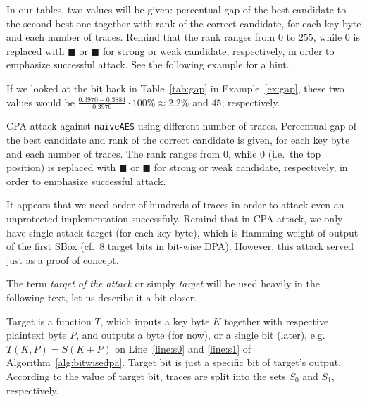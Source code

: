	\begin{note}
	\label{note:tabvals}
		In our tables, two values will be given: percentual gap of the best candidate to the second best one together with rank of the correct candidate, for each key byte and each number of traces. Remind that the rank ranges from $0$ to $255$, while $0$ is replaced with $\blacksquare$ or {\weak$\blacksquare$} for strong or weak candidate, respectively, in order to emphasize successful attack. See the following example for a hint.
	\end{note}
	
	\begin{example}
	\label{ex:gaprank}
		If we looked at the  bit back in Table~\ref{tab:gap} in Example~\ref{ex:gap}, these two values would be $\frac{0.3970-0.3884}{0.3970}\cdot100\%\approx2.2\%$ and $45$, respectively.
	\end{example}
	
	\begin{table}[h]
		\begin{center}
		
		\end{center}
	\caption{CPA attack against {\tt naiveAES} using different number of traces. Percentual gap of the best candidate and rank of the correct candidate is given, for each key byte and each number of traces. The rank ranges from $0$, while $0$ (i.e.\ the top position) is replaced with $\blacksquare$ or {\weak$\blacksquare$} for strong or weak candidate, respectively, in order to emphasize successful attack.}
	\label{tab:naiveaescpa}
	\end{table}
	
	It appears that we need order of hundreds of traces in order to attack even an unprotected implementation successfuly. Remind that in CPA attack, we only have single attack target (for each key byte), which is Hamming weight of output of the first SBox (cf.\ $8$ target bits in bit-wise DPA). However, this attack served just as a proof of concept.
	
	\begin{note}
	\label{note:target}
		The term {\em target of the attack} or simply {\em target} will be used heavily in the following text, let us describe it a bit closer.
		
		Target is a function $T$, which inputs a key byte $K$ together with respective plaintext byte $P$, and outputs a byte (for now), or a single bit (later), e.g.\ $T(K,P) = S(K+P)$ on Line~\ref{line:s0} and \ref{line:s1} of Algorithm~\ref{alg:bitwisedpa}. Target bit is just a specific bit of target's output. According to the value of target bit, traces are split into the sets $S_0$ and $S_1$, respectively.
	\end{note}

